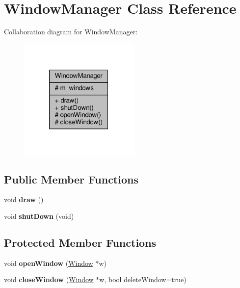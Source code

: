 \hypertarget{classWindowManager}{}\section{Window\+Manager Class Reference}
\label{classWindowManager}


Collaboration diagram for Window\+Manager\+:
\nopagebreak
\begin{figure}[H]
\begin{center}
\leavevmode
\includegraphics[width=169pt]{d0/d38/classWindowManager__coll__graph}
\end{center}
\end{figure}
\subsection*{Public Member Functions}
\begin{DoxyCompactItemize}
\item 
void {\bfseries draw} ()\hypertarget{classWindowManager_a9a853862abff7827e6462cfdb536c6ed}{}\label{classWindowManager_a9a853862abff7827e6462cfdb536c6ed}

\item 
void {\bfseries shut\+Down} (void)\hypertarget{classWindowManager_aa9fb367739e8f5a175207b6e36a73e49}{}\label{classWindowManager_aa9fb367739e8f5a175207b6e36a73e49}

\end{DoxyCompactItemize}
\subsection*{Protected Member Functions}
\begin{DoxyCompactItemize}
\item 
void {\bfseries open\+Window} (\hyperlink{classWindow}{Window} $\ast$w)\hypertarget{classWindowManager_a22b964670ea1eeff51b42f3f8ace739c}{}\label{classWindowManager_a22b964670ea1eeff51b42f3f8ace739c}

\item 
void {\bfseries close\+Window} (\hyperlink{classWindow}{Window} $\ast$w, bool delete\+Window=true)\hypertarget{classWindowManager_a6eecff7380ade11fc07db55e675327a5}{}\label{classWindowManager_a6eecff7380ade11fc07db55e675327a5}

\end{DoxyCompactItemize}
